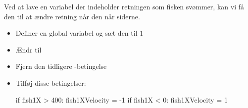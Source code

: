 \documentclass{ucph-handout}
\begin{document}
\begin{exercisebox}[adjusted title= Skifte retning]
Ved at lave en variabel der indeholder retningen som fisken svømmer,
kan vi få den til at ændre retning når den når siderne.

\begin{itemize}
\item Definer en global variabel  og sæt den til $1$
\item Ændr  til 
\item Fjern den tidligere -betingelse
\item Tilføj disse betingelser:
\begin{python}
if fish1X > 400:
    fish1XVelocity = -1
if fish1X < 0:
    fish1XVelocity = 1
\end{python}
\end{itemize}
\end{exercisebox}
\end{document}
